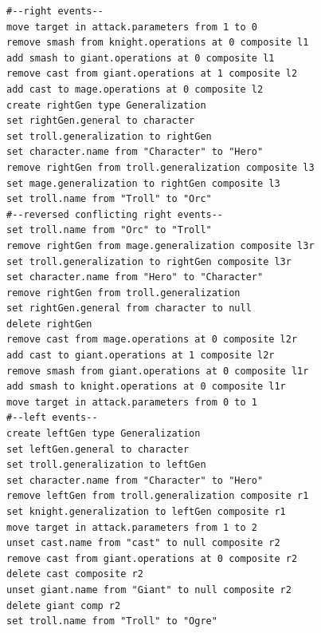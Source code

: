 \begin{lstlisting}[firstnumber=1,style=eol,caption={Merged change events (operations) of the models in Fig. \ref{fig:class_diagram_rpg} and Listings \ref{lst:cbp_right} and \ref{lst:cbp_left} using EMF Store. The commented lines are added only to improve readability.},label=lst:cbp_merged_emfs]
#--right events--
move target in attack.parameters from 1 to 0
remove smash from knight.operations at 0 composite l1
add smash to giant.operations at 0 composite l1
remove cast from giant.operations at 1 composite l2
add cast to mage.operations at 0 composite l2
create rightGen type Generalization
set rightGen.general to character
set troll.generalization to rightGen
set character.name from "Character" to "Hero"
remove rightGen from troll.generalization composite l3
set mage.generalization to rightGen composite l3
set troll.name from "Troll" to "Orc"
#--reversed conflicting right events--
set troll.name from "Orc" to "Troll"
remove rightGen from mage.generalization composite l3r
set troll.generalization to rightGen composite l3r
set character.name from "Hero" to "Character"
remove rightGen from troll.generalization
set rightGen.general from character to null
delete rightGen
remove cast from mage.operations at 0 composite l2r
add cast to giant.operations at 1 composite l2r
remove smash from giant.operations at 0 composite l1r
add smash to knight.operations at 0 composite l1r
move target in attack.parameters from 0 to 1
#--left events--
create leftGen type Generalization
set leftGen.general to character
set troll.generalization to leftGen
set character.name from "Character" to "Hero"
remove leftGen from troll.generalization composite r1
set knight.generalization to leftGen composite r1
move target in attack.parameters from 1 to 2
unset cast.name from "cast" to null composite r2
remove cast from giant.operations at 0 composite r2
delete cast composite r2
unset giant.name from "Giant" to null composite r2
delete giant comp r2
set troll.name from "Troll" to "Ogre"
\end{lstlisting}

